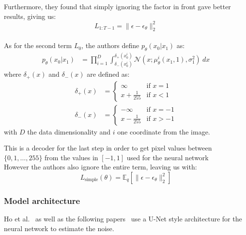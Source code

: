 \documentclass{article}
\numberwithin{equation}{section}
\numberwithin{figure}{section}
\begin{document}
Furthermore, they found that simply ignoring the factor in front gave better results, giving us:
\begin{equation}
  L_{1:T-1} = \| \epsilon - \epsilon_\theta \|_2^2
\end{equation}
\\
As for the second term $L_0$, the authors define $p_\theta(x_0 | x_1)$ as:
\begin{align}
  p_\theta(x_0 | x_1) &= \prod_{i=1}^{D} \int_{\delta_{-} (x_0^i)}^{\delta_{+} (x_0^i)} \mathcal{N}(x; \mu_\theta^i (x_1, 1), \sigma^2_1) \: dx
\end{align}
\hspace{0.5cm} where $\delta_{+} (x)$ and $\delta_{-} (x)$ are defined as:
\begin{align}
  \delta_{+} (x) &= \begin{cases}
    \infty & \text{if } x = 1 \\
    x + \frac{1}{255} & \text{if } x < 1 
  \end{cases}\\
  \delta_{-} (x) &= \begin{cases}
    - \infty & \text{if } x = - 1 \\
    x - \frac{1}{255} & \text{if } x > -1 
  \end{cases}
\end{align}
\hspace{0.5cm} with $D$ the data dimensionality and $i$ one coordinate from the image.

This is a decoder for the last step in order to get pixel values between $\{0, 1, \dots, 255 \}$ from the values in $[-1, 1]$ used for the neural network~\cite{ho2020denoising,nichol2021improved} \\
However the authors also ignore the entire term, leaving us with:
\begin{equation}
  L_{\text{simple}}(\theta) = \mathbb{E}_q \left[ \| \epsilon - \epsilon_\theta \|_2^2 \right] \label{eq:l_simple}
\end{equation}

\subsubsection{Model architecture}\label{subsubsec:model_architecture}
Ho et al.~\cite{ho2020denoising} as well as the following papers~\cite{dhariwal2021diffusion, nichol2021improved, song2022denoising} use a U-Net style architecture for the neural network to estimate the noise. 
\end{document}
